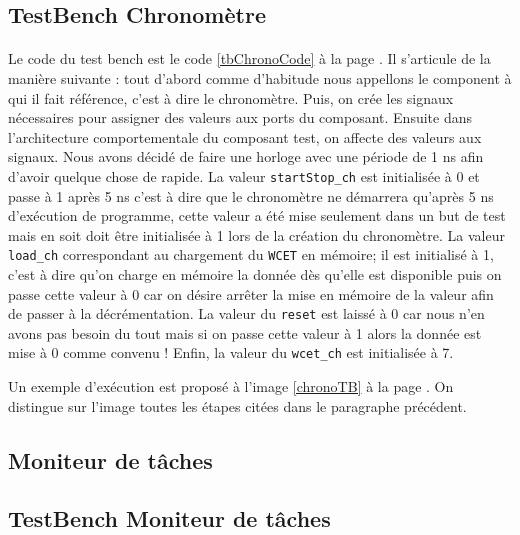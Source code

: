 \documentclass[a4paper,12pt]{report}
\begin{document}
			
		\subsection{TestBench Chronomètre}
			\paragraph*{}
			Le code du test bench est le code \ref{tbChronoCode} à la page \pageref{tbChronoCode}. Il s'articule de la manière suivante : tout d'abord comme d'habitude nous appellons le component à qui il fait référence, c'est à dire le chronomètre. Puis, on crée les signaux nécessaires pour assigner des valeurs aux ports du composant. Ensuite dans l'architecture comportementale du composant test, on affecte des valeurs aux signaux. Nous avons décidé de faire une horloge avec une période de 1 ns afin d'avoir quelque chose de rapide. La valeur \texttt{startStop\_ch} est initialisée à 0 et passe à 1 après 5 ns c'est à dire que le chronomètre ne démarrera qu'après 5 ns d'exécution de programme, cette valeur a été mise seulement dans un but de test mais en soit doit être initialisée à 1 lors de la création du chronomètre. La valeur \texttt{load\_ch} correspondant au chargement du \texttt{WCET} en mémoire; il est initialisé à 1, c'est à dire qu'on charge en mémoire la donnée dès qu'elle est disponible puis on passe cette valeur à 0 car on désire arrêter la mise en mémoire de la valeur afin de passer à la décrémentation. La valeur du \texttt{reset} est laissé à 0 car nous n'en avons pas besoin du tout mais si on passe cette valeur à 1 alors la donnée est mise à 0 comme convenu ! Enfin, la valeur du \texttt{wcet\_ch} est initialisée à 7.
			
			Un exemple d'exécution est proposé à l'image \ref{chronoTB} à la page \pageref{chronoTB}. On distingue sur l'image toutes les étapes citées dans le paragraphe précédent.
			
		\subsection{Moniteur de tâches}
			\paragraph*{}
			
	
		\subsection{TestBench Moniteur de tâches}
\end{document}
